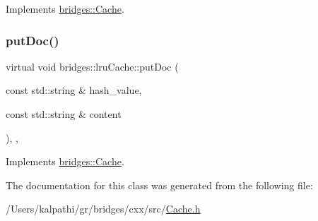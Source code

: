 Implements \mbox{\hyperlink{classbridges_1_1_cache_abf3601225841d14dcd5611cd6a223ba4}{bridges\+::\+Cache}}.

\mbox{\label{classbridges_1_1lru_cache_a927fa1186ba830717ce11898c2beb4c7}} 
\subsubsection{\texorpdfstring{putDoc()}{putDoc()}}
{\footnotesize\ttfamily virtual void bridges\+::lru\+Cache\+::put\+Doc (\begin{DoxyParamCaption}\item[{const std\+::string \&}]{hash\+\_\+value,  }\item[{const std\+::string \&}]{content }\end{DoxyParamCaption})\hspace{0.3cm}{\ttfamily [inline]}, {\ttfamily [override]}, {\ttfamily [virtual]}}



Implements \mbox{\hyperlink{classbridges_1_1_cache_ae74225542568a377fdcaf0354e466954}{bridges\+::\+Cache}}.



The documentation for this class was generated from the following file\+:\begin{DoxyCompactItemize}
\item 
/\+Users/kalpathi/gr/bridges/cxx/src/\mbox{\hyperlink{_cache_8h}{Cache.\+h}}\end{DoxyCompactItemize}
